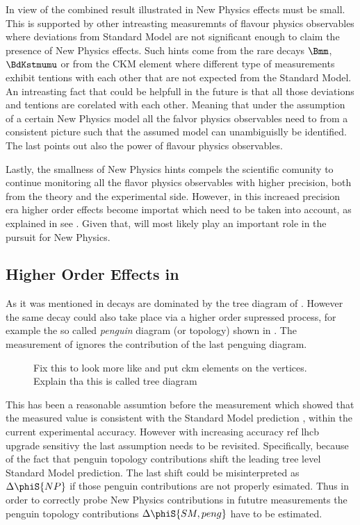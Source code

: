 In view of the combined \phis result illustrated in  New Physics effects must be small.
This is supported by other intreasting measuremnts of flavour physics observables where deviations from Standard Model are not significant enough
to claim the presence of New Physics effects. Such hints come from the rare decays $\Bmm$, $\BdKstmumu$ or from the \Vub CKM element
where different type of measurements exhibit tentions with each other that are not expected from the Standard Model.
An intreasting fact that could be helpfull in the future is that all those deviations and tentions are
corelated with each other. Meaning that under the assumption of a certain New Physics model all the falvor physics
observables need to from a consistent picture such that the assumed model can unambiguislly be identified.
The last points out also the power of flavour physics observables.

Lastly, the smallness of New Physics hints compels the scientific comunity to continue monitoring all the
flavor physics observables with higher precision, both from the theory and the experimental side.
However, in this increaed precision era higher order effects become importat which need to be taken into account,
as explained in see . Given that, \phis will most likely play an important role in the
pursuit for New Physics.

\subsection{Higher Order Effects in \phis}
\label{TheBsJpsiKstDecay}
As it was mentioned in  \BsJpsiPhi decays are dominated by the tree diagram of .
However the same decay could also take place via a higher order supressed process, for example the so called {\it penguin} diagram (or topology)
shown in . The \phis measurement of  ignores the contribution of the last penguing diagram.

\begin{figure}[h]
  \centering
  {\sffamily }
  \caption{{\color{red} Fix this to look more like  and put ckm elements on the vertices}. Explain tha this is called tree diagram}
  \label{bs2jpsiphi_peng}
\end{figure}

\noindent This has been a reasonable assumtion before the \lhcb measurement which showed that the measured  value is consistent with the Standard
Model prediction , within the current experimental accuracy. However with increasing accuracy {\color{red} ref lhcb upgrade \phis sensitivy}
the last assumption needs to be revisited.
Specifically, because of the fact that penguin topology contributions shift the leading tree level Standard Model prediction.
The last shift could be misinterpreted as $\Delta\phiS{NP}$ if those penguin contributions are not properly esimated.
Thus in order to correctly probe New Physics contributions in fututre measurements the penguin topology contributions $\Delta\phiS{SM,peng}$
have to be estimated.

